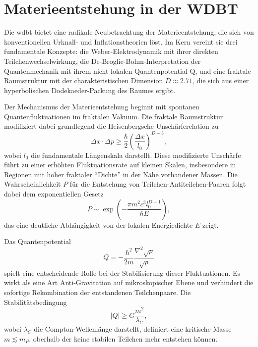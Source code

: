 \section{Materieentstehung in der WDBT}
Die \gls{wdbt} bietet eine radikale Neubetrachtung der Materieentstehung, die sich von konventionellen Urknall- und Inflationstheorien löst. Im Kern vereint sie drei fundamentale Konzepte:
die Weber-Elektrodynamik mit ihrer direkten Teilchenwechselwirkung, die De-Broglie-Bohm-Interpretation der Quantenmechanik mit ihrem nicht-lokalen Quantenpotential Q, und eine fraktale
Raumstruktur mit der charakteristischen Dimension $D \approx 2.71$, die sich aus einer hyperbolischen Dodekaeder-Packung des Raumes ergibt.

Der Mechanismus der Materieentstehung beginnt mit spontanen Quantenfluktuationen im fraktalen Vakuum. Die fraktale Raumstruktur modifiziert dabei grundlegend die Heisenbergsche
Unschärferelation zu
\begin{equation}
    \Delta x \cdot \Delta p \geq \frac{\hbar}{2} \left( \frac{\Delta x}{l_0} \right)^{D-3},
\end{equation}
wobei $l_0$ die fundamentale Längenskala darstellt. Diese modifizierte Unschärfe führt zu einer erhöhten Fluktuationsrate auf kleinen Skalen, insbesondere in Regionen mit hoher fraktaler
\enquote{Dichte} in der Nähe vorhandener Massen. Die Wahrscheinlichkeit $P$ für die Entstehung von Teilchen-Antiteilchen-Paaren folgt dabei dem exponentiellen Gesetz
\begin{equation}
    P \sim \exp \left( -\frac{\pi m^2 c^3 l_0^{D-1}}{\hbar E} \right),
\end{equation}
das eine deutliche Abhängigkeit von der lokalen Energiedichte $E$ zeigt.

Das Quantenpotential
\begin{equation}
    Q = -\frac{\hbar^2}{2m} \frac{\nabla^2 \sqrt{\rho}}{\sqrt{\rho}}
\end{equation}
spielt eine entscheidende Rolle bei der Stabilisierung dieser Fluktuationen. Es wirkt als eine Art Anti-Gravitation auf mikroskopischer Ebene und verhindert die sofortige Rekombination
der entstandenen Teilchenpaare. Die Stabilitätsbedingung
\begin{equation}
    \left| Q \right| \ge G \frac{m^{2}}{\lambda_C},
\end{equation}
wobei $\lambda_C$ die Compton-Wellenlänge darstellt, definiert eine kritische Masse $m \lesssim m_P$, oberhalb der keine stabilen Teilchen mehr entstehen können.

